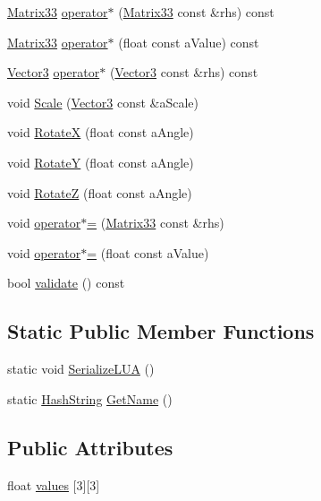 \begin{DoxyCompactItemize}
\item 
\hyperlink{structMatrix33}{Matrix33} \hyperlink{structMatrix33_a59de5040d8aeb65e9c2172c9fc052fc1}{operator$\ast$} (\hyperlink{structMatrix33}{Matrix33} const \&rhs) const 
\item 
\hyperlink{structMatrix33}{Matrix33} \hyperlink{structMatrix33_a5991d9a0748acbb67f64255b7d559ec2}{operator$\ast$} (float const a\+Value) const 
\item 
\hyperlink{structVector3}{Vector3} \hyperlink{structMatrix33_a4c2d43f4b02383789b246cc3d8a6183c}{operator$\ast$} (\hyperlink{structVector3}{Vector3} const \&rhs) const 
\item 
void \hyperlink{structMatrix33_a699b89d96c7681113cd68e08e3c34081}{Scale} (\hyperlink{structVector3}{Vector3} const \&a\+Scale)
\item 
void \hyperlink{structMatrix33_a7050ba70b3b20fcd50e94123e8ebf215}{RotateX} (float const a\+Angle)
\item 
void \hyperlink{structMatrix33_acd3b966f8e6380db043c0de1fec37623}{RotateY} (float const a\+Angle)
\item 
void \hyperlink{structMatrix33_ad2d03a77b65ddd29d708e34efa5059e8}{RotateZ} (float const a\+Angle)
\item 
void \hyperlink{structMatrix33_a79e54810f659584577c49a311505a42a}{operator$\ast$=} (\hyperlink{structMatrix33}{Matrix33} const \&rhs)
\item 
void \hyperlink{structMatrix33_acb666d5ec913392a2d50c5587d63c69c}{operator$\ast$=} (float const a\+Value)
\item 
bool \hyperlink{structMatrix33_a4057dfaa9c2edf8d3abe23873a491cd1}{validate} () const 
\end{DoxyCompactItemize}
\subsection*{Static Public Member Functions}
\begin{DoxyCompactItemize}
\item 
static void \hyperlink{structMatrix33_a2733264500f4d19860ca6718337c2d37}{Serialize\+L\+UA} ()
\item 
static \hyperlink{classHashString}{Hash\+String} \hyperlink{structMatrix33_acc56ce2dbc4840b2fcb86191b6f56d53}{Get\+Name} ()
\end{DoxyCompactItemize}
\subsection*{Public Attributes}
\begin{DoxyCompactItemize}
\item 
float \hyperlink{structMatrix33_a2844bb64a3b8e9b3ac3357c41c05f56d}{values} \mbox{[}3\mbox{]}\mbox{[}3\mbox{]}
\end{DoxyCompactItemize}


